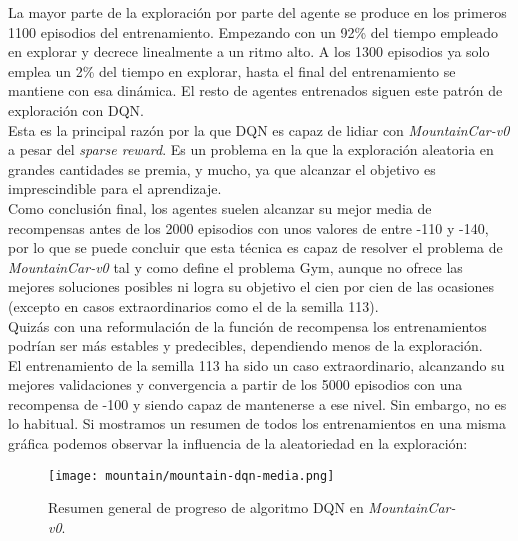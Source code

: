 \documentclass[11pt,fleqn]{book} %
\begin{document}
La mayor parte de la exploración por parte del agente se produce en los primeros 1100 episodios del entrenamiento. Empezando con un 92\% del tiempo empleado en explorar y decrece linealmente a un ritmo alto. A los 1300 episodios ya solo emplea un 2\% del tiempo en explorar, hasta el final del entrenamiento se mantiene con esa dinámica. El resto de agentes entrenados siguen este patrón de exploración con DQN. \\

Esta es la principal razón por la que DQN es capaz de lidiar con \textit{MountainCar-v0} a pesar del \textit{sparse reward}. Es un problema en la que la exploración aleatoria en grandes cantidades se premia, y mucho, ya que alcanzar el objetivo es imprescindible para el aprendizaje. \cite{article:sparse} \\

Como conclusión final, los agentes suelen alcanzar su mejor media de recompensas antes de los 2000 episodios con unos valores de entre -110 y -140, por lo que se puede concluir que esta técnica es capaz de resolver el problema de \textit{MountainCar-v0} tal y como define el problema Gym, aunque no ofrece las mejores soluciones posibles ni logra su objetivo el cien por cien de las ocasiones (excepto en casos extraordinarios como el de la semilla 113).\\

Quizás con una reformulación de la función de recompensa los entrenamientos podrían ser más estables y predecibles, dependiendo menos de la exploración. \\

El entrenamiento de la semilla 113 ha sido un caso extraordinario, alcanzando su mejores validaciones y convergencia a partir de los 5000 episodios con una recompensa de -100 y siendo capaz de mantenerse a ese nivel. Sin embargo, no es lo habitual. Si mostramos un resumen de todos los entrenamientos en una misma gráfica podemos observar la influencia de la aleatoriedad en la exploración:

\begin{figure}[H]
	\centering\texttt{[image: mountain/mountain-dqn-media.png]}
	\caption{Resumen general de progreso de algoritmo DQN en \textit{MountainCar-v0}.}
	\label{fig:mountainDQNmedia} %
\end{figure} 
\end{document}
